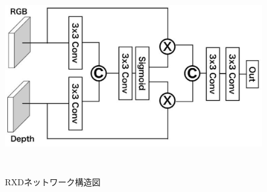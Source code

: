 \begin{figure}[htbt]
	\centering
	 \includegraphics[height=85mm]{RXD.eps}
	 \caption{RXDネットワーク構造図}
	 \label{fig:f2}
\end{figure}



